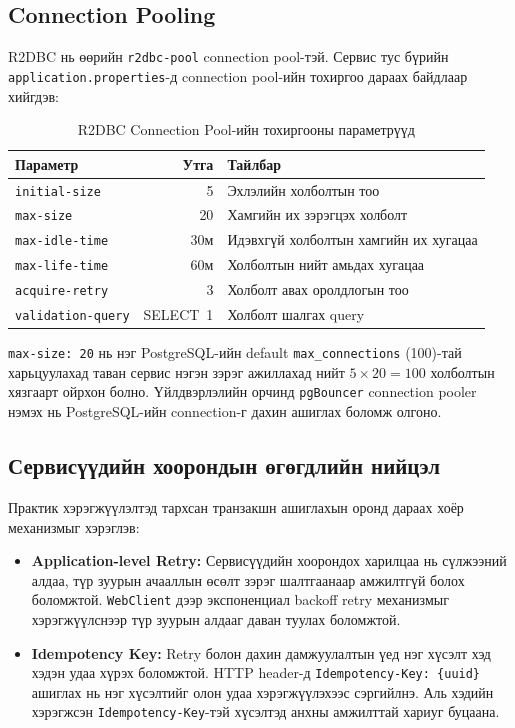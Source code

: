 \subsection{Connection Pooling}

R2DBC нь өөрийн \texttt{r2dbc-pool} connection pool-тэй. Сервис
тус бүрийн \texttt{application.properties}-д connection pool-ийн тохиргоо
дараах байдлаар хийгдэв:

\begin{table}[H]
    \centering
    \caption{R2DBC Connection Pool-ийн тохиргооны параметрүүд}
    \label{tab:r2dbc_pool}
    \renewcommand{\arraystretch}{0.7}
    \begin{tabular}{lrl}
        \toprule
        \textbf{Параметр} & \textbf{Утга} & \textbf{Тайлбар} \\
        \midrule
        \texttt{initial-size}       & 5   & Эхлэлийн холболтын тоо \\
        \texttt{max-size}           & 20  & Хамгийн их зэрэгцэх холболт \\
        \texttt{max-idle-time}      & 30м & Идэвхгүй холболтын хамгийн их хугацаа \\
        \texttt{max-life-time}      & 60м & Холболтын нийт амьдах хугацаа \\
        \texttt{acquire-retry}      & 3   & Холболт авах оролдлогын тоо \\
        \texttt{validation-query}   & SELECT~1 & Холболт шалгах query \\
        \bottomrule
    \end{tabular}
\end{table}

\texttt{max-size: 20} нь нэг PostgreSQL-ийн default \texttt{max\_connections}
(100)-тай харьцуулахад таван сервис нэгэн зэрэг ажиллахад нийт
$5 \times 20 = 100$ холболтын хязгаарт ойрхон болно. Үйлдвэрлэлийн
орчинд \texttt{pgBouncer} connection pooler нэмэх нь PostgreSQL-ийн
connection-г дахин ашиглах боломж олгоно.

\subsection{Сервисүүдийн хоорондын өгөгдлийн нийцэл}

Практик хэрэгжүүлэлтэд тархсан транзакшн ашиглахын оронд
дараах хоёр механизмыг хэрэглэв:
\begin{itemize}
	\item \textbf{Application-level Retry:} Сервисүүдийн хоорондох
		харилцаа нь сүлжээний алдаа, түр зуурын ачааллын өсөлт зэрэг
		шалтгаанаар амжилтгүй болох боломжтой. \texttt{WebClient} дээр
		экспоненциал backoff retry механизмыг хэрэгжүүлснээр түр зуурын
		алдааг даван туулах боломжтой.
	\item \textbf{Idempotency Key:} Retry болон дахин дамжуулалтын үед
		нэг хүсэлт хэд хэдэн удаа хүрэх боломжтой. HTTP header-д
		\texttt{Idempotency-Key: \{uuid\}} ашиглах нь нэг хүсэлтийг
		олон удаа хэрэгжүүлэхээс сэргийлнэ. Аль хэдийн хэрэгжсэн
		\texttt{Idempotency-Key}-тэй хүсэлтэд анхны амжилттай хариуг буцаана.
\end{itemize}

